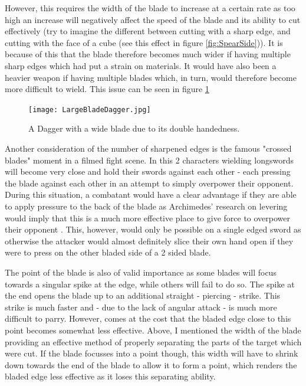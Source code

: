 \documentclass{article}
\begin{document}
However, this requires the width of the blade to increase at a certain rate as too high an increase will negatively affect the speed of the blade and its ability to cut effectively (try to imagine the different between cutting with a sharp edge, and cutting with the face of a cube (see this effect in figure \ref{fig:SpearSide})). It is because of this that the blade therefore becomes much wider if having multiple sharp edges which had put a strain on materials. It would have also been a heavier weapon if having multiple blades which, in turn, would therefore become more difficult to wield. This issue can be seen in figure \ref{fig:WideDagger}

\begin{figure}[h]
    \centering
    \texttt{[image: LargeBladeDagger.jpg]}
    \caption{A Dagger with a wide blade due to its double handedness.}
    \label{fig:WideDagger}
\end{figure}

Another consideration of the number of sharpened edges is the famous "crossed blades" moment in a filmed fight scene. In this 2 characters wielding longswords will become very close and hold their swords against each other - each pressing the blade against each other in an attempt to simply overpower their opponent. During this situation, a combatant would have a clear advantage if they are able to apply pressure to the back of the blade as Archimedes' research on levering would imply that this is a much more effective place to give force to overpower their opponent \parencite{bunn2017archimedes}. This, however, would only be possible on a single edged sword as otherwise the attacker would almost definitely slice their own hand open if they were to press on the other bladed side of a 2 sided blade.

The point of the blade is also of valid importance as some blades will focus towards a singular spike at the edge, while others will fail to do so. The spike at the end opens the blade up to an additional straight - piercing - strike. This strike is much faster and - due to the lack of angular attack - is much more difficult to parry. However, comes at the cost that the bladed edge close to this point becomes somewhat less effective. Above, I mentioned the width of the blade providing an effective method of properly separating the parts of the target which were cut. If the blade focusses into a point though, this width will have to shrink down towards the end of the blade to allow it to form a point, which renders the bladed edge less effective as it loses this separating ability.
\end{document}
